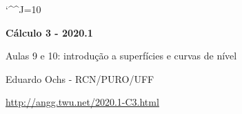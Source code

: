 \documentclass[oneside,12pt]{article}
\begin{document}
\catcode`\^^J=10

\pu

\long{}
\long{}
\long{}
\long{}
\long{}
\long{}
\long{}
\long{}
\long{}
\long{}

\long{}
\long{}

\def\frown{\ensuremath{{=}{(}}}
\def\True {\mathbf{V}}
\def\False{\mathbf{F}}

\def\drafturl{http://angg.twu.net/LATEX/2020-1-C2.pdf}
\def\drafturl{http://angg.twu.net/2020.1-C2.html}
\def\draftfooter{\tiny \href{\drafturl}{\jobname{}} \ColorBrown{\shorttoday{} \hours}}


%

\thispagestyle{empty}

\begin{center}

\vspace*{1.2cm}

{\bf \Large Cálculo 3 - 2020.1}

\bsk

Aulas 9 e 10: introdução a superfícies e curvas de nível

\bsk

Eduardo Ochs - RCN/PURO/UFF

\url{http://angg.twu.net/2020.1-C3.html}

\end{center}

\newpage

\vspace*{2cm}
\end{document}

